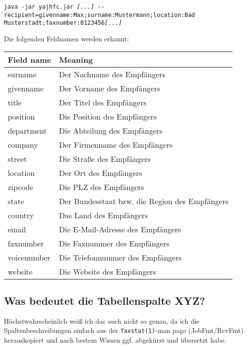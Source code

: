 \documentclass[a4paper,10pt,halfparskip,noparindent]{scrartcl}
\begin{document}
\texttt{java -jar yajhfc.jar \textit{[...]} -{-}recipient=\dq givenname:Max;surname:Mustermann;location:Bad Musterstadt;faxnumber:0123456\dq \textit{[...]}}

Die folgenden Feldnamen werden erkannt:
\begin{center}
\begin{tabular}{|l|p{}|}
\hline
\bfseries Field name & \bfseries Meaning \\
\hline\hline
\ttfamily surname & Der Nachname des Empfängers \\\hline
\ttfamily givenname & Der Vorname des Empfängers \\\hline
\ttfamily title & Der Titel des Empfängers \\\hline
\ttfamily position & Die Position des Empfängers \\\hline
\ttfamily department & Die Abteilung des Empfängers\\\hline
\ttfamily company & Der Firmenname des Empfängers\\\hline
\ttfamily street & Die Straße des Empfängers \\\hline
\ttfamily location & Der Ort des Empfängers\\\hline
\ttfamily zipcode & Die PLZ des Empfängers \\\hline
\ttfamily state & Der Bundesstaat bzw. die Region des Empfängers\\\hline
\ttfamily country & Das Land des Empfängers\\\hline
\ttfamily email & Die E-Mail-Adresse des Empfängers\\\hline
\ttfamily faxnumber & Die Faxnummer des Empfängers \\\hline
\ttfamily voicenumber & Die Telefonnummer des Empfängers \\\hline
\ttfamily website & Die Website des Empfängers\\\hline
\end{tabular}
\end{center}

\subsection{Was bedeutet die Tabellenspalte XYZ?}

Höchstwahrscheinlich weiß ich das auch nicht so genau, da ich die
Spaltenbeschreibungen einfach aus der \verb.faxstat(1).-man page (JobFmt/RcvFmt)
herauskopiert und nach bestem Wissen ggf. abgekürzt und übersetzt habe.
\end{document}
